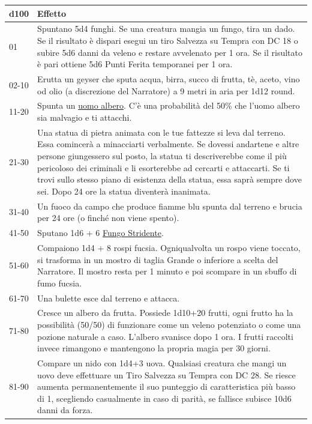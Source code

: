 \begin{multicols}{2}
\noindent\begin{tabularx}{0.50\textwidth}{lX}
\textbf{d100} & \textbf{Effetto}\\
\hline
01 &Spuntano 5d4 funghi. Se una creatura mangia un fungo, tira un dado. Se il risultato è dispari esegui un tiro Salvezza su Tempra con DC 18 o subire 5d6 danni da veleno e restare avvelenato per 1 ora. Se il risultato è pari ottiene 5d6 Punti Ferita temporanei per 1 ora.\\
02-10 &Erutta un geyser che sputa acqua, birra, succo di frutta, tè, aceto, vino od olio (a discrezione del Narratore) a 9 metri in aria per 1d12 round.\\
11-20 &Spunta un \hyperlink{Uomo Albero (Arborom)}{uomo albero}. C'è una probabilità del 50\% che l'uomo albero sia malvagio e ti attacchi.\\
21-30 &Una statua di pietra animata con le tue fattezze si leva dal terreno. Essa comincerà a minacciarti verbalmente. Se dovessi andartene e altre persone giungessero sul posto, la statua ti descriverebbe come il più pericoloso dei criminali e li esorterebbe ad cercarti e attaccarti. Se ti trovi sullo stesso piano di esistenza della statua, essa saprà sempre dove sei. Dopo 24 ore la statua diventerà inanimata.\\
31-40 &Un fuoco da campo che produce fiamme blu spunta dal terreno e brucia per 24 ore (o finché non viene spento).\\
41-50 &Sputano 1d6 + 6 \hyperlink{Fungo Stridente}{Fungo Stridente}.\\
51-60 &Compaiono 1d4 + 8 rospi fucsia. Ogniqualvolta un rospo viene toccato, si trasforma in un mostro di taglia Grande o inferiore a scelta del Narratore. Il mostro resta per 1 minuto e poi scompare in un sbuffo di fumo fucsia. \\
61-70 & Una bulette esce dal terreno e attacca.\\
71-80 &Cresce un albero da frutta. Possiede 1d10+20 frutti, ogni frutto ha la possibilità (50/50) di funzionare come un veleno potenziato o come una pozione naturale a caso. L'albero svanisce dopo 1 ora. I frutti raccolti invece rimangono e mantengono la propria magia per 30 giorni. \\
81-90 &Compare un nido con 1d4+3 uova. Qualsiasi creatura che mangi un uovo deve effettuare un Tiro Salvezza su Tempra con DC 28. Se riesce aumenta permanentemente il suo punteggio di caratteristica più basso di 1, scegliendo casualmente in caso di parità, se fallisce subisce 10d6 danni da forza.\\

\end{tabularx}
\end{multicols}
